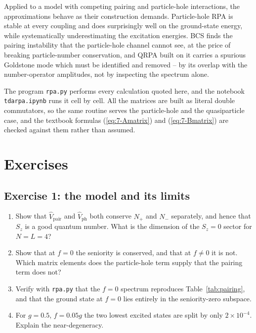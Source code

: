 Applied to a model with competing pairing and particle-hole interactions, the
approximations behave as their construction demands.  Particle-hole RPA is
stable at every coupling and does surprisingly well on the ground-state
energy, while systematically underestimating the excitation energies.  BCS
finds the pairing instability that the particle-hole channel cannot see, at
the price of breaking particle-number conservation, and QRPA built on it
carries a spurious Goldstone mode which must be identified and removed --
by its overlap with the number-operator amplitudes, not by inspecting the
spectrum alone.

The program \texttt{rpa.py} performs every calculation quoted here, and the
notebook \texttt{tdarpa.ipynb} runs it cell by cell.  All the matrices are
built as literal double commutators, so the same routine serves the
particle-hole and the quasiparticle case, and the textbook formulas
(\ref{eq:7-Amatrix}) and (\ref{eq:7-Bmatrix}) are checked against them rather
than assumed.

\section{Exercises}
\label{sec:ch7exercises}

\subsection*{Exercise 1: the model and its limits}
\label{ex:7-model}

\begin{enumerate}
  \item[a)] Show that $\hat{V}_{\mathrm{pair}}$ and $\hat{V}_{\mathrm{ph}}$
  both conserve $N_+$ and $N_-$ separately, and hence that $S_z$ is a good
  quantum number.  What is the dimension of the $S_z=0$ sector for $N=L=4$?
  \item[b)] Show that at $f=0$ the seniority is conserved, and that at
  $f\ne0$ it is not.  Which matrix elements does the particle-hole term
  supply that the pairing term does not?
  \item[c)] Verify with \texttt{rpa.py} that the $f=0$ spectrum reproduces
  Table~\ref{tab:pairing}, and that the ground state at $f=0$ lies entirely
  in the seniority-zero subspace.
  \item[d)] For $g=0.5$, $f=0.05g$ the two lowest excited states are split by
  only $2\times10^{-4}$.  Explain the near-degeneracy.
\end{enumerate}

